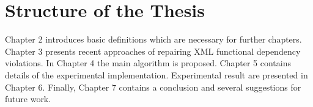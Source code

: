 \section{Structure of the Thesis}

Chapter 2 introduces basic definitions which are necessary for further chapters. Chapter 3 presents recent approaches of repairing XML functional dependency violations. In Chapter 4 the main algorithm is proposed. Chapter 5 contains details of the experimental implementation. Experimental result are presented in Chapter 6. Finally, Chapter 7 contains a conclusion and several suggestions for future work.
